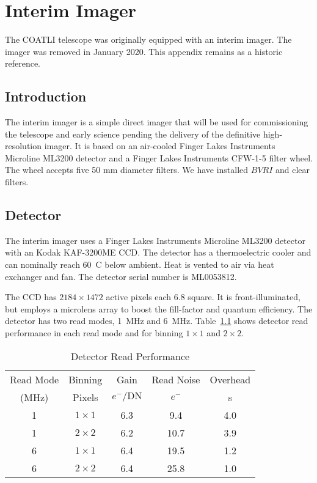 \chapter{Interim Imager}
\label{appendix:interim-imager}

The COATLI telescope was originally equipped with an interim imager. The imager was removed in January 2020. This appendix remains as a historic reference.

\section{Introduction}

The interim imager is a simple direct imager that will be used for commissioning the telescope and early science pending the delivery of the definitive high-resolution imager. It is based on an air-cooled Finger Lakes Instruments Microline ML3200 detector and a Finger Lakes Instruments CFW-1-5 filter wheel. The wheel accepts five 50 mm diameter filters. We have installed $BVRI$ and clear filters.

\section{Detector}

The interim imager uses a Finger Lakes Instruments Microline ML3200 detector with an Kodak KAF-3200ME CCD. The detector has a thermoelectric cooler and can nominally reach 60~C below ambient. Heat is vented to air via heat exchanger and fan. The detector serial number is ML0053812.

The CCD has $2184 \times 1472$ active pixels each 6.8 {\micron} square. It is front-illuminated, but employs a microlens array to boost the fill-factor and quantum efficiency. The detector has two read modes, 1~MHz and 6~MHz. Table~\ref{table:detector-read-performance} shows detector read performance in each read mode and for binning $1\times1$ and $2\times2$.

\begin{table}
\caption{Detector Read Performance}
\label{table:detector-read-performance}
\begin{center}
\begin{tabular}{ccccc}
\hline
\hline
Read Mode&Binning&Gain&Read Noise&Overhead\\
(MHz)&Pixels&$e^-/\mathrm{DN}$&$e^-$&s\\
\hline
1&$1 \times 1$&6.3&\phantom{0}9.4&4.0\\
1&$2 \times 2$&6.2&\phantom{}10.7&3.9\\
6&$1 \times 1$&6.4&\phantom{}19.5&1.2\\
6&$2 \times 2$&6.4&\phantom{}25.8&1.0\\
\hline
\end{tabular}
\end{center}
\end{table}

